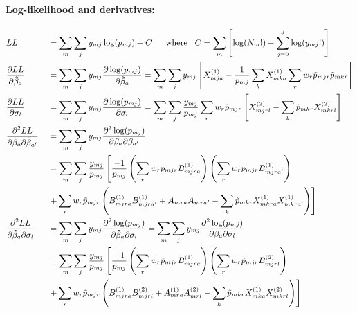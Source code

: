 \documentclass[12pt]{article}
\begin{document}
\paragraph{Log-likelihood and derivatives: \\}
\begin{equation}
\small
\begin{aligned}
	& LL && = \sum_m \sum_{j} y_{mj} \log(p_{mj}) + C \hspace*{15pt}  \text{where } \hspace*{5pt} C =\sum_m \left[ \log(N_m!) - \sum_{j=0}^J \log(y_{mj}!) \right] \\
	& \frac{\partial LL}{\partial \tilde{\beta}_a} && = \sum_m \sum_{j} y_{mj} \frac{\partial \log(p_{mj})}{\partial \tilde{\beta}_a} = \sum_m \sum_{j} y_{mj} \left[ X_{mja}^{(1)} - \frac{1}{p_{mj}} \sum_k X_{mka}^{(1)} \sum_r w_r \tilde{p}_{mjr} \tilde{p}_{mkr} \right] \\
	& \frac{\partial LL}{\partial \sigma_l} && = \sum_m \sum_{j} y_{mj} \frac{\partial \log(p_{mj})}{\partial \sigma_l} = \sum_m \sum_{j} \frac{y_{mj}}{p_{mj}} \sum_r w_r \tilde{p}_{mjr} \left[ X_{mjrl}^{(2)} - \sum_k \tilde{p}_{mkr} X_{mkrl}^{(2)} \right] \\
	& \frac{\partial^2 LL}{\partial \tilde{\beta}_a \partial \tilde{\beta}_{a'}} && = \sum_m \sum_{j} y_{mj} \frac{\partial^2 \log(p_{mj})}{\partial \beta_a \partial \beta_{a'}} \\
	& && = \sum_m \sum_j \frac{y_{mj}}{p_{mj}} \left[ \frac{-1}{p_{mj}} \left( \sum_r w_r \tilde{p}_{mjr} B^{(1)}_{mjra} \right) \left( \sum_r w_r \tilde{p}_{mjr} B^{(1)}_{mjra'} \right) \right. \\
	& && \left. + \sum_r w_r \tilde{p}_{mjr} \left( B^{(1)}_{mjra} B^{(1)}_{mjra'} + A_{mra} A_{mra'} - \sum_k \tilde{p}_{mkr} X^{(1)}_{mkra} X^{(1)}_{mkra'} \right) \right] \\
	& \frac{\partial^2 LL}{\partial \tilde{\beta}_a \partial \sigma_l} && = \sum_m \sum_{j} y_{mj} \frac{\partial^2 \log(p_{mj})}{\partial \tilde{\beta}_a \partial \sigma_l} = \sum_m \sum_{j} y_{mj} \frac{\partial^2 \log(p_{mj})}{\partial \beta_a \partial \sigma_{l}} \\
	& && = \sum_m \sum_j \frac{y_{mj}}{p_{mj}} \left[ \frac{-1}{p_{mj}} \left( \sum_r w_r \tilde{p}_{mjr} B^{(1)}_{mjra} \right) \left( \sum_r w_r \tilde{p}_{mjr} B^{(2)}_{mjrl} \right) \right. \\
	& && \left. + \sum_r w_r \tilde{p}_{mjr} \left( B^{(1)}_{mjra} B^{(2)}_{mjrl} + A^{(1)}_{mra} A^{(2)}_{mrl} - \sum_k \tilde{p}_{mkr} X^{(1)}_{mka} X^{(2)}_{mkrl} \right) \right] \\

\end{aligned}
\end{equation}
\end{document}
